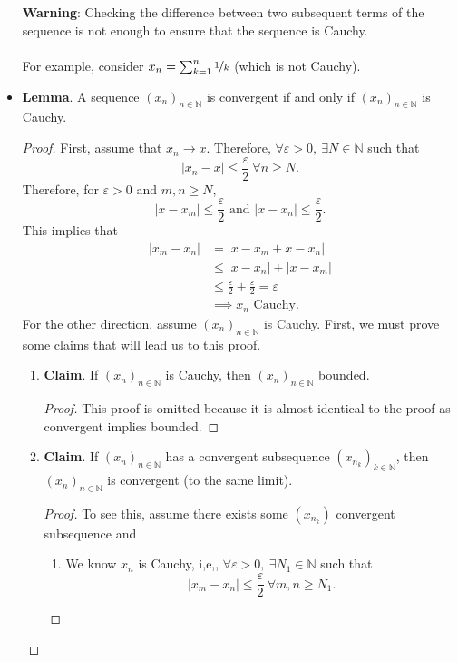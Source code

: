 \documentclass{article}
\newcommand{\N}{\mathbb{N}}
\newcommand{\seq}[2]{(#1_{#2})_{#2 \in \N}}
\newcommand{\?}{\stackrel{?}{=}}
\begin{document}
\begin{itemize}
    \textbf{Warning}: Checking the difference between two subsequent terms of the sequence is not enough to ensure that the sequence is Cauchy. \\\\
    For example, consider $x_n = \sum_{k = 1}^n \nicefrac{1}{k}$ (which is not Cauchy).
    \item \textbf{Lemma}. A sequence $\seq{x}{n}$ is convergent if and only if $\seq{x}{n}$ is Cauchy.
    \begin{proof}
        First, assume that $x_n \rightarrow x$. Therefore, $\forall \varepsilon > 0, \ \exists N \in \N$ such that
        $$|x_n - x| \leq \frac{\varepsilon}{2} \ \forall n \geq N.$$
        Therefore, for $\varepsilon > 0$ and $m, n \geq N$,
        $$|x - x_m| \leq \frac{\varepsilon}{2} \text{ and } |x - x_n| \leq \frac{\varepsilon}{2}.$$
        This implies that
        \begin{align*}
            |x_m - x_n| &= |x - x_m + x - x_n| \\
            &\leq |x - x_n| + |x - x_m| \\
            &\leq \frac{\varepsilon}{2} + \frac{\varepsilon}{2} = \varepsilon \\
            &\implies x_n \text{ Cauchy}.
        \end{align*}
        For the other direction, assume $\seq{x}{n}$ is Cauchy. First, we must prove some claims that will lead us to this proof.
        \begin{enumerate}[label=(\arabic*)]
            \item \textbf{Claim}. If $\seq{x}{n}$ is Cauchy, then $\seq{x}{n}$ bounded.
            \begin{proof}
                This proof is omitted because it is almost identical to the proof as convergent implies bounded.
            \end{proof}
            \item \textbf{Claim}. If $\seq{x}{n}$ has a convergent subsequence $(x_{n_k})_{k \in \N}$, then $\seq{x}{n}$ is convergent (to the same limit).
            \begin{proof}
                To see this, assume there exists some $(x_{n_k})$ convergent subsequence and
                \begin{enumerate}[label=(\roman*)]
                    \item We know $x_n$ is Cauchy, i,e,, $\forall \varepsilon > 0, \ \exists N_1 \in \N$ such that
                    $$|x_m - x_n| \leq \frac{\varepsilon}{2} \ \forall m, n \geq N_1.$$

\end{enumerate}
\end{proof}
\end{enumerate}
\end{proof}
\end{itemize}
\end{document}
